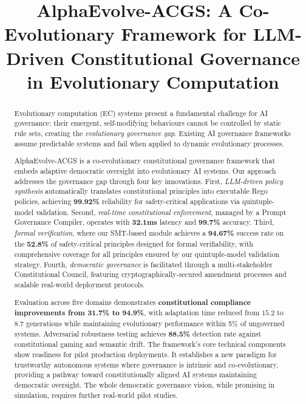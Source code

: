 \documentclass[manuscript,screen,review,anonymous,9pt]{acmart}
\begin{document}
\title{AlphaEvolve-ACGS: A Co-Evolutionary Framework for LLM-Driven Constitutional Governance in Evolutionary Computation}


\begin{abstract}
	Evolutionary computation (EC) systems present a fundamental challenge for AI governance: their emergent, self-modifying behaviours cannot be controlled by static rule sets, creating the \textit{evolutionary governance gap}. Existing AI governance frameworks assume predictable systems and fail when applied to dynamic evolutionary processes.

	AlphaEvolve-ACGS is a co-evolutionary constitutional governance framework that embeds adaptive democratic oversight into evolutionary AI systems. Our approach addresses the governance gap through four key innovations. First, \textit{LLM-driven policy synthesis} automatically translates constitutional principles into executable Rego policies, achieving \textbf{99.92\%} reliability for safety-critical applications via quintuple-model validation. Second, \textit{real-time constitutional enforcement}, managed by a Prompt Governance Compiler, operates with \textbf{32.1ms} latency and \textbf{99.7\%} accuracy. Third, \textit{formal verification}, where our SMT-based module achieves a \textbf{94.67\%} success rate on the \textbf{52.8\%} of safety-critical principles designed for formal verifiability, with comprehensive coverage for all principles ensured by our quintuple-model validation strategy. Fourth, \textit{democratic governance} is facilitated through a multi-stakeholder Constitutional Council, featuring cryptographically-secured amendment processes and scalable real-world deployment protocols.

	Evaluation across five domains demonstrates \textbf{constitutional compliance improvements from 31.7\% to 94.9\%}, with adaptation time reduced from $15.2$ to $8.7$ generations while maintaining evolutionary performance within 5\% of ungoverned systems. Adversarial robustness testing achieves \textbf{88.5\%} detection rate against constitutional gaming and semantic drift. The framework's core technical components show readiness for pilot production deployments. It establishes a new paradigm for trustworthy autonomous systems where governance is intrinsic and co-evolutionary, providing a pathway toward constitutionally aligned AI systems maintaining democratic oversight. The whole democratic governance vision, while promising in simulation, requires further real-world pilot studies.
\end{abstract}
\end{document}
